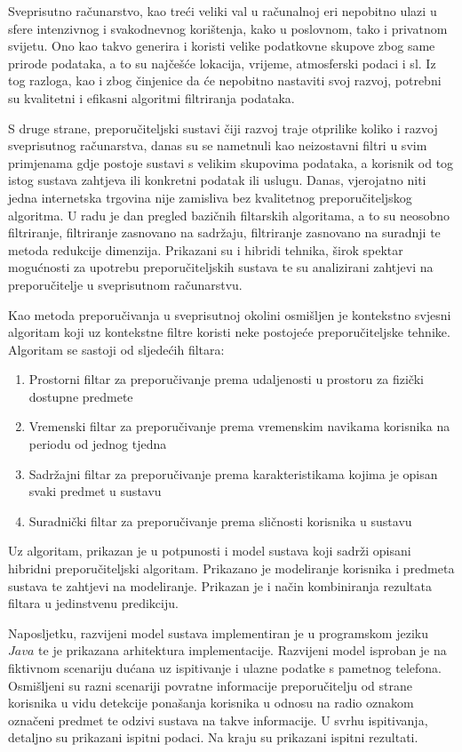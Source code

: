 \documentclass[times, utf8, diplomski, numeric]{fer}
\begin{document}
Sveprisutno računarstvo, kao treći veliki val u računalnoj eri nepobitno ulazi u
sfere intenzivnog i svakodnevnog korištenja, kako u poslovnom, tako i privatnom
svijetu. Ono kao takvo generira i koristi velike podatkovne skupove zbog same
prirode podataka, a to su najčešće lokacija, vrijeme, atmosferski podaci i sl.
Iz tog razloga, kao i zbog činjenice da će nepobitno nastaviti svoj razvoj,
potrebni su kvalitetni i efikasni algoritmi filtriranja podataka.

S druge strane, preporučiteljski sustavi čiji razvoj traje otprilike koliko i
razvoj sveprisutnog računarstva, danas su se nametnuli kao neizostavni filtri u
svim primjenama gdje postoje sustavi s velikim skupovima podataka, a korisnik od
tog istog sustava zahtjeva ili konkretni podatak ili uslugu. Danas, vjerojatno
niti jedna internetska trgovina nije zamisliva bez kvalitetnog preporučiteljskog
algoritma. U radu je dan pregled bazičnih filtarskih algoritama, a to su
neosobno filtriranje, filtriranje zasnovano na sadržaju, filtriranje zasnovano
na suradnji te metoda redukcije dimenzija. Prikazani su i hibridi tehnika, širok
spektar mogućnosti za upotrebu preporučiteljskih sustava te su analizirani
zahtjevi na preporučitelje u sveprisutnom računarstvu.

Kao metoda preporučivanja u sveprisutnoj okolini osmišljen je kontekstno svjesni
algoritam koji uz kontekstne filtre koristi neke postojeće preporučiteljske
tehnike. Algoritam se sastoji od sljedećih filtara:
\begin{enumerate}
  \item Prostorni filtar za preporučivanje prema udaljenosti u prostoru za
  fizički dostupne predmete
  \item Vremenski filtar za preporučivanje prema vremenskim navikama korisnika
  na periodu od jednog tjedna
  \item Sadržajni filtar za preporučivanje prema karakteristikama kojima je
  opisan svaki predmet u sustavu
  \item Suradnički filtar za preporučivanje prema sličnosti korisnika u sustavu
\end{enumerate}

Uz algoritam, prikazan je u potpunosti i model sustava koji sadrži opisani
hibridni preporučiteljski algoritam. Prikazano je modeliranje korisnika i
predmeta sustava te zahtjevi na modeliranje. Prikazan je i način kombiniranja
rezultata filtara u jedinstvenu predikciju.

Naposljetku, razvijeni model sustava implementiran je u programskom jeziku
$Java$ te je prikazana arhitektura implementacije. Razvijeni model isproban je
na fiktivnom scenariju dućana uz ispitivanje i ulazne podatke s pametnog
telefona. Osmišljeni su razni scenariji povratne informacije preporučitelju od
strane korisnika u vidu detekcije ponašanja korisnika u odnosu na radio oznakom
označeni predmet te odzivi sustava na takve informacije. U svrhu ispitivanja,
detaljno su prikazani ispitni podaci. Na kraju su prikazani ispitni rezultati.
\end{document}
